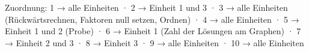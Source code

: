 
Zuordnung: 1 → alle Einheiten · 2 → Einheit 1 und 3 · 3 → alle Einheiten (Rückwärtsrechnen, Faktoren null setzen, Ordnen) · 4 → alle Einheiten · 5 → Einheit 1 und 2 (Probe) · 6 → Einheit 1 (Zahl der Lösungen am Graphen) · 7 → Einheit 2 und 3 · 8 → Einheit 3 · 9 → alle Einheiten · 10 → alle Einheiten

